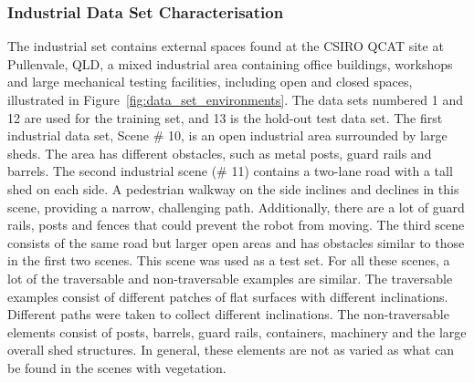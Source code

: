\subsubsection{Industrial Data Set Characterisation}
\label{subsec:industrial_data_set}
The industrial set contains external spaces found at the CSIRO QCAT site at Pullenvale, QLD, a mixed industrial area containing office buildings, workshops and large mechanical testing facilities, including open and closed spaces, illustrated in Figure~\ref{fig:data_set_environments}. The data sets numbered 1  and 12 are used for the training set, and 13 is the hold-out test data set. The first industrial data set, Scene \# 10, is an open industrial area surrounded by large sheds. The area has different obstacles, such as metal posts, guard rails and barrels. The second industrial scene (\# 11) contains a two-lane road with a tall shed on each side. A pedestrian walkway on the side inclines and declines in this scene, providing a narrow, challenging path. Additionally, there are a lot of guard rails, posts and fences that could prevent the robot from moving. The third scene consists of the same road but larger open areas and has obstacles similar to those in the first two scenes. This scene was used as a test set. For all these scenes, a lot of the traversable and non-traversable examples are similar. The traversable examples consist of different patches of flat surfaces with different inclinations. Different paths were taken to collect different inclinations. The non-traversable elements consist of posts, barrels, guard rails, containers, machinery and the large overall shed structures. In general, these elements are not as varied as what can be found in the scenes with vegetation.

